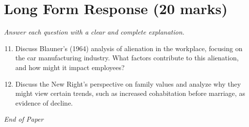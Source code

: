 \documentclass[12pt]{article}
\begin{document}
\section*{Long Form Response (20 marks)}
\textit{Answer each question with a clear and complete explanation.}
\begin{enumerate}[label=\arabic*.]
\setcounter{enumi}{10}
\item Discuss Blauner's (1964) analysis of alienation in the workplace, focusing on the car manufacturing industry. What factors contribute to this alienation, and how might it impact employees?
\item Discuss the New Right's perspective on family values and analyze why they might view certain trends, such as increased cohabitation before marriage, as evidence of decline.
\end{enumerate}

\vfill
\noindent\textit{End of Paper}
\end{document}
